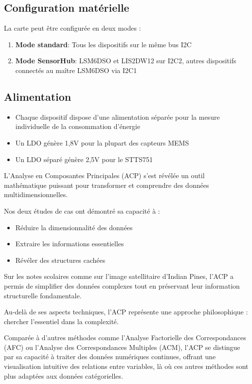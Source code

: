 \documentclass[12pt]{article}
\begin{document}
\subsection{Configuration matérielle}
La carte peut être configurée en deux modes :
\begin{enumerate}
    \item \textbf{Mode standard}: Tous les dispositifs sur le même bus I2C
    \item \textbf{Mode SensorHub}: LSM6DSO et LIS2DW12 sur I2C2, autres dispositifs connectés au maître LSM6DSO via I2C1
\end{enumerate}

\subsection{Alimentation}
\begin{itemize}
    \item Chaque dispositif dispose d'une alimentation séparée pour la mesure individuelle de la consommation d'énergie
    \item Un LDO génère 1,8V pour la plupart des capteurs MEMS
    \item Un LDO séparé génère 2,5V pour le STTS751
\end{itemize}

\newpage


L'Analyse en Composantes Principales (ACP) s'est révélée un outil mathématique puissant pour transformer et comprendre des données multidimensionnelles. 

Nos deux études de cas ont démontré sa capacité à :
\begin{itemize}
    \item Réduire la dimensionnalité des données
    \item Extraire les informations essentielles
    \item Révéler des structures cachées
\end{itemize}

Sur les notes scolaires comme sur l'image satellitaire d'Indian Pines, l'ACP a permis de simplifier des données complexes tout en préservant leur information structurelle fondamentale.

Au-delà de ses aspects techniques, l'ACP représente une approche philosophique : chercher l'essentiel dans la complexité.

Comparée à d'autres méthodes comme l'Analyse Factorielle des Correspondances (AFC) ou l'Analyse des Correspondances Multiples (ACM), l'ACP se distingue par sa capacité à traiter des données numériques continues, offrant une visualisation intuitive des relations entre variables, là où ces autres méthodes sont plus adaptées aux données catégorielles.
\end{document}
